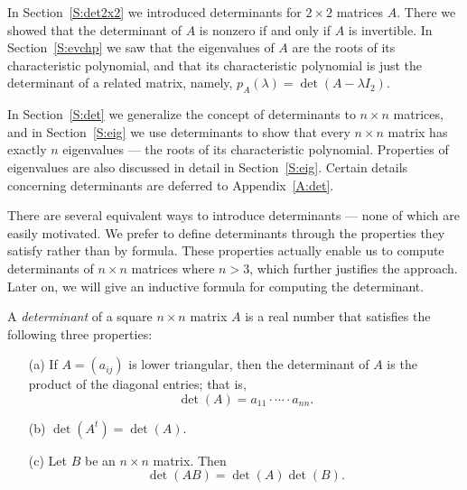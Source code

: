 \label{C:D&E}

\normalsize

In Section~\ref{S:det2x2} we introduced determinants for $2\times 2$
matrices $A$.  There we showed that the determinant of $A$
is nonzero if and only if $A$ is invertible.  In Section~\ref{S:evchp} 
we saw that the eigenvalues of $A$ are the roots of its 
characteristic polynomial, and that its characteristic polynomial
is just the determinant of a related matrix, namely, 
$p_A(\lambda) = \det(A-\lambda I_2)$. 

In Section~\ref{S:det} we generalize the concept of determinants to
$n\times n$ matrices, and in Section~\ref{S:eig} we use determinants 
to show that every $n\times n$ matrix has exactly $n$ eigenvalues --- 
the roots of its characteristic polynomial.  Properties of eigenvalues 
are also discussed in detail in Section~\ref{S:eig}.
Certain details concerning determinants are deferred to Appendix~\ref{A:det}.



\label{S:det}
 
There are several equivalent ways to introduce determinants --- none of which 
are easily motivated.  We prefer to define determinants through the properties 
they satisfy rather than by formula.  These properties actually enable us to 
compute determinants of $n\times n$ matrices where $n>3$, which further 
justifies the approach. Later on, we will give an inductive formula 
 for computing the determinant. 
 
\begin{Def}  \label{D:determinants}
A {\em determinant\/} of a square $n\times n$ matrix $A$ is a real
number that satisfies the following three properties:
\begin{itemize} 
\item[(a)]  If $A=(a_{ij})$ is lower 
triangular, then
the determinant of $A$ is the product of the diagonal entries;
that is,
\[
\det(A) = a_{11}\cdot\cdots\cdot a_{nn}.
\]
\item[(b)]  $\det(A^t)=\det(A)$.
\item[(c)]  Let $B$ be an $n\times n$ matrix.  
Then
\begin{equation} \label{e:detproduct}
\det(AB) = \det(A)\det(B).
\end{equation}
\end{itemize}
\end{Def} 

